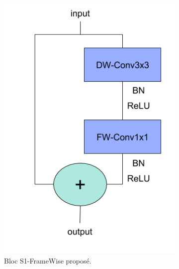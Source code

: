 \begin{figure}[!htb]
\centering
\begin{subfigure}{0.48\textwidth}
\includegraphics[width=\textwidth]{figures/stride1-FW.png}%
\caption{Bloc S1-FrameWise proposé.}%
\label{fig:FWS1}%
\end{subfigure}
\hspace*{\fill}
\begin{subfigure}{0.48\textwidth}

\end{subfigure}
\end{figure}
